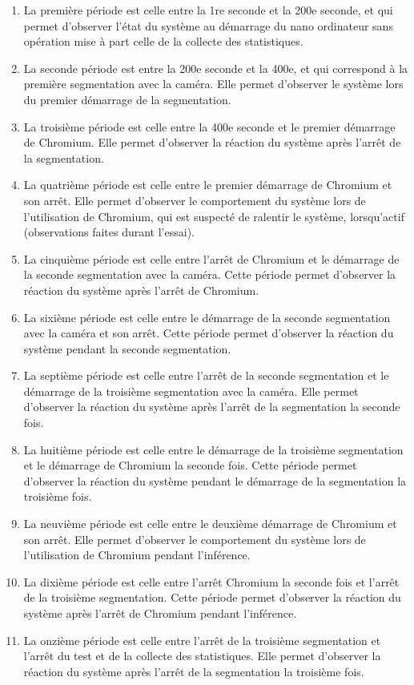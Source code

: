 \begin{enumerate}
   \item La première période est celle entre la 1re seconde et la 200e seconde, et qui permet d'observer l'état du système au démarrage du nano ordinateur sans opération mise à part celle de la collecte des statistiques. 
   \item La seconde période est entre la 200e seconde et la 400e, et qui correspond à la première segmentation avec la caméra. Elle permet d'observer le système lors du premier démarrage de la segmentation. 
   \item La troisième période est celle entre la 400e seconde et le premier démarrage de Chromium. Elle permet d'observer la réaction du système après l'arrêt de la segmentation. 
   \item La quatrième période est celle entre le premier démarrage de Chromium et son arrêt. Elle permet d'observer le comportement du système lors de l'utilisation de Chromium, qui est suspecté de ralentir le système, lorsqu'actif (observations faites durant l'essai).
   \item La cinquième période est celle entre l'arrêt de Chromium et le démarrage de la seconde segmentation avec la caméra. Cette période permet d'observer la réaction du système après l'arrêt de Chromium. 
   \item La sixième période est celle entre le démarrage de la seconde segmentation avec la caméra et son arrêt. Cette période permet d'observer la réaction du système pendant la seconde segmentation. 
   \item La septième période est celle entre l'arrêt de la seconde segmentation et le démarrage de la troisième segmentation avec la caméra. Elle permet d'observer la réaction du système après l'arrêt de la segmentation la seconde fois. 
   \item La huitième période est celle entre le démarrage de la troisième segmentation et le démarrage de Chromium la seconde fois. Cette période permet d'observer la réaction du système pendant le démarrage de la segmentation la troisième fois. 
   \item La neuvième période est celle entre le deuxième démarrage de Chromium et son arrêt. Elle permet d'observer le comportement du système lors de l'utilisation de Chromium pendant l'inférence.
   \item La dixième période est celle entre l'arrêt Chromium la seconde fois et l'arrêt de la troisième segmentation. Cette période permet d'observer la réaction du système après l'arrêt de Chromium pendant l'inférence. 
   \item La onzième période est celle entre l'arrêt de la troisième segmentation et l'arrêt du test et de la collecte des statistiques. Elle permet d'observer la réaction du système après l'arrêt de la segmentation la troisième fois. 
\end{enumerate} 
